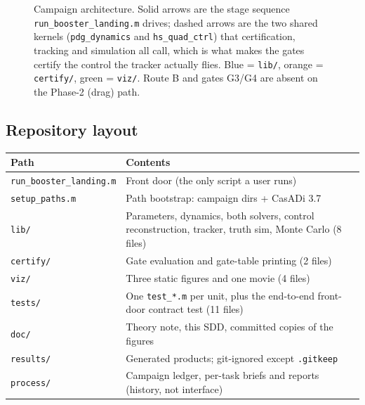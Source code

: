 \documentclass[11pt]{article}
\newcommand{\file}[1]{\texttt{#1}}
\begin{document}
\begin{figure}[htbp]
\caption{Campaign architecture. Solid arrows are the stage sequence
\file{run\_booster\_landing.m} drives; dashed arrows are the two shared
kernels (\texttt{pdg\_dynamics} and \texttt{hs\_quad\_ctrl}) that
certification, tracking and simulation all call, which is what makes the
gates certify the control the tracker actually flies. Blue = \file{lib/},
orange = \file{certify/}, green = \file{viz/}. Route B and gates G3/G4 are
absent on the Phase-2 (drag) path.}
\label{fig:arch}
\end{figure}

\subsection{Repository layout}

\begin{center}
\begin{tabular}{@{}lL{10.4cm}@{}}
\toprule
Path & Contents \\
\midrule
\file{run\_booster\_landing.m} & Front door (the only script a user runs) \\
\file{setup\_paths.m} & Path bootstrap: campaign dirs + CasADi 3.7 \\
\file{lib/} & Parameters, dynamics, both solvers, control reconstruction,
tracker, truth sim, Monte Carlo (8 files) \\
\file{certify/} & Gate evaluation and gate-table printing (2 files) \\
\file{viz/} & Three static figures and one movie (4 files) \\
\file{tests/} & One \texttt{test\_*.m} per unit, plus the end-to-end
front-door contract test (11 files) \\
\file{doc/} & Theory note, this SDD, committed copies of the figures \\
\file{results/} & Generated products; git-ignored except \file{.gitkeep} \\
\file{process/} & Campaign ledger, per-task briefs and reports (history,
not interface) \\
\bottomrule
\end{tabular}
\end{center}
\end{document}
